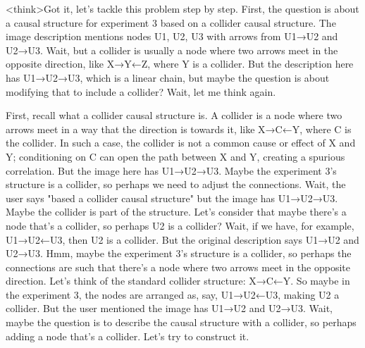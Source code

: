 <think>Got it, let's tackle this problem step by step. First, the question is about a causal structure for experiment 3 based on a collider causal structure. The image description mentions nodes U1, U2, U3 with arrows from U1→U2 and U2→U3. Wait, but a collider is usually a node where two arrows meet in the opposite direction, like X→Y←Z, where Y is a collider. But the description here has U1→U2→U3, which is a linear chain, but maybe the question is about modifying that to include a collider? Wait, let me think again.

First, recall what a collider causal structure is. A collider is a node where two arrows meet in a way that the direction is towards it, like X→C←Y, where C is the collider. In such a case, the collider is not a common cause or effect of X and Y; conditioning on C can open the path between X and Y, creating a spurious correlation. But the image here has U1→U2→U3. Maybe the experiment 3's structure is a collider, so perhaps we need to adjust the connections. Wait, the user says "based a collider causal structure" but the image has U1→U2→U3. Maybe the collider is part of the structure. Let's consider that maybe there's a node that's a collider, so perhaps U2 is a collider? Wait, if we have, for example, U1→U2←U3, then U2 is a collider. But the original description says U1→U2 and U2→U3. Hmm, maybe the experiment 3's structure is a collider, so perhaps the connections are such that there's a node where two arrows meet in the opposite direction. Let's think of the standard collider structure: X→C←Y. So maybe in the experiment 3, the nodes are arranged as, say, U1→U2←U3, making U2 a collider. But the user mentioned the image has U1→U2 and U2→U3. Wait, maybe the question is to describe the causal structure with a collider, so perhaps adding a node that's a collider. Let's try to construct it.

